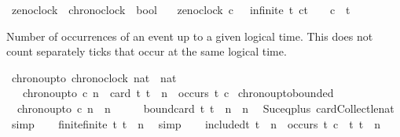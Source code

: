 \begin{isabellebody}
\isamarkupfalse%
\ zeno{\isacharunderscore}clock\ {\isacharcolon}{\isacharcolon}\ {\isacartoucheopen}chronoclock\ {\isasymRightarrow}\ bool{\isacartoucheclose}\isanewline
\ \ \ {\isacartoucheopen}zeno{\isacharunderscore}clock\ c\ {\isasymequiv}\ {\isacharparenleft}{\isasymexists}{\isasymomega}{\isachardot}\ infinite\ {\isacharbraceleft}t{\isachardot}\ c\isactrlbsub t\isactrlesub \ {\isasymle}\ {\isasymomega}\ {\isasymand}\ c\ {\isasymnabla}\ t{\isacharbraceright}{\isacharparenright}{\isacartoucheclose}%
\begin{isamarkuptext}%
Number of occurrences of an event up to a given logical time.
This does not count separately ticks that occur at the same logical time.%
\end{isamarkuptext}\isamarkuptrue%
\isamarkupfalse%
\ chrono{\isacharunderscore}up{\isacharunderscore}to\ {\isacharcolon}{\isacharcolon}{\isacartoucheopen}{\isacharbrackleft}chronoclock{\isacharcomma}\ nat{\isacharbrackright}\ {\isasymRightarrow}\ nat{\isacartoucheclose}\isanewline
\ \ \ {\isacartoucheopen}chrono{\isacharunderscore}up{\isacharunderscore}to\ c\ n\ {\isacharequal}\ card\ {\isacharbraceleft}t{\isachardot}\ t\ {\isasymle}\ n\ {\isasymand}\ occurs\ t\ c{\isacharbraceright}{\isacartoucheclose}\isanewline
\isanewline
{}\isamarkupfalse%
\ chrono{\isacharunderscore}up{\isacharunderscore}to{\isacharunderscore}bounded{\isacharcolon}\isanewline
\ \ {\isacartoucheopen}chrono{\isacharunderscore}up{\isacharunderscore}to\ c\ n\ {\isasymle}\ n{\isacharplus}{}{\isacartoucheclose}\isanewline
%
\isadelimproof
%
\endisadelimproof
%
\isatagproof
{}\isamarkupfalse%
\ {\isacharminus}\isanewline
\ \ \isamarkupfalse%
\ bound{\isacharcolon}{\isacartoucheopen}card\ {\isacharbraceleft}t{\isachardot}\ t\ {\isasymle}\ n{\isacharbraceright}\ {\isacharequal}\ n{\isacharplus}{}{\isacartoucheclose}\ \isamarkupfalse%
\ Suc{\isacharunderscore}eq{\isacharunderscore}plus{}\ card{\isacharunderscore}Collect{\isacharunderscore}le{\isacharunderscore}nat\ \isamarkupfalse%
\ simp\isanewline
\ \ \isamarkupfalse%
\ finite{\isacharcolon}{\isacartoucheopen}finite\ {\isacharbraceleft}t{\isachardot}\ t\ {\isasymle}\ n{\isacharbraceright}{\isacartoucheclose}\ \isamarkupfalse%
\ simp\isanewline
\ \ \isamarkupfalse%
\ included{\isacharcolon}{\isacartoucheopen}{\isacharbraceleft}t{\isachardot}\ t\ {\isasymle}\ n\ {\isasymand}\ occurs\ t\ c{\isacharbraceright}\ {\isasymsubseteq}\ {\isacharbraceleft}t{\isachardot}\ t\ {\isasymle}\ n{\isacharbraceright}{\isacartoucheclose}\ \isamarkupfalse%

\end{isabellebody}
